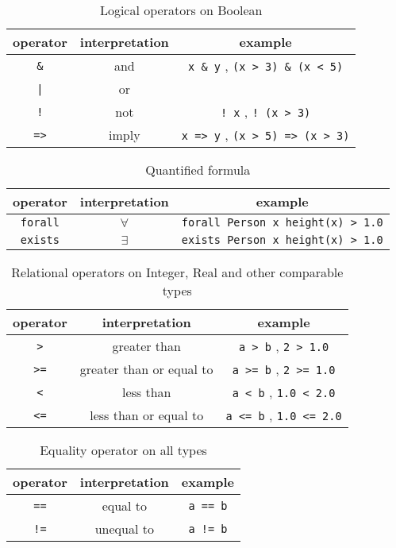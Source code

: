 \documentclass[12pt]{article}
\begin{document}
\begin{table}[h!]
\centering
\caption{Logical operators on Boolean}
\begin{tabular}{ c c c }
\toprule 
operator & interpretation & example \\
\midrule
\verb|&| & and & \verb|x & y| , \verb|(x > 3) & (x < 5)| \\ 
{\tt |} & or & \verb\x | y\ , \verb\(x > 5) | (x < 3)\ \\ 
{\tt !} & not & \verb|! x| , \verb|! (x > 3)| \\
{\tt =>} & imply & \verb|x => y| , \verb|(x > 5) => (x > 3)| \\
\bottomrule
\end{tabular}
\end{table}

\begin{table}[h!]
\centering
\caption{Quantified formula}
\begin{tabular}{ c c c }
\toprule 
operator & interpretation & example \\
\midrule
{\tt forall} & $\forall$ & \verb|forall Person x height(x) > 1.0| \\ 
{\tt exists} & $\exists$ & \verb|exists Person x height(x) > 1.0|  \\ 
\bottomrule
\end{tabular}
\end{table}

\begin{table}[h!]
\centering
\caption{Relational operators on Integer, Real and other comparable types}
\begin{tabular}{ c c c }
\toprule 
operator & interpretation & example \\
\midrule
{\tt >} & greater than & \verb|a > b| ,  \verb|2 > 1.0|\\ 
{\tt >=} & greater than or equal to & \verb|a >= b| ,  \verb|2 >= 1.0| \\ 
{\tt <} & less than & \verb|a < b| ,  \verb|1.0 < 2.0| \\
{\tt <=} & less than or equal to & \verb|a <= b| ,  \verb|1.0 <= 2.0|  \\
\bottomrule
\end{tabular}
\end{table}

\begin{table}[h!]
\centering
\caption{Equality operator on all types}
\begin{tabular}{ c c c }
\toprule 
operator & interpretation & example \\
\midrule
{\tt ==} & equal to & \verb|a == b|   \\ 
{\tt !=} & unequal to & \verb|a != b|  \\ 
\bottomrule
\end{tabular}
\end{table}
\end{document}
